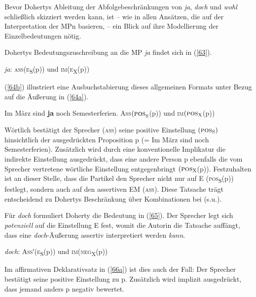 Bevor Dohertys Ableitung der Abfolgebeschränkungen von \textit{ja}, \textit{doch} und \textit{wohl} schließlich skizziert werden kann, ist – wie in allen Ansätzen, die auf der Interpretation der MPn basieren, – ein Blick auf ihre Modellierung der Einzelbedeutungen nötig.

Dohertys Bedeutungszuschreibung an die MP \textit{ja} findet sich in (\ref{63}).

\begin{exe}
	\ex\label{63} 
		\textit{ja}: \textsc{ass}(\textsc{e}\textsubscript{S}(\textrm{p})) und \textsc{im}(\textsc{e}\textsubscript{X}(\textrm{p}))
		\hfill\hbox{\citet[80]{Doherty1985}}
\end{exe}
(\ref{64b}) illustriert eine Ausbuchstabierung dieses allgemeinen Formats unter Bezug auf die Äußerung in (\ref{64a}).

\begin{exe}
	\ex\label{64} 
		\begin{xlist}	
			\ex\label{64a} Im März sind \textbf{ja} noch Semesterferien.
			\ex\label{64b} \textsc{Ass}${(\textsc{pos}}_{\textrm{{S}}}$(\textrm{p})) und \textsc{im}$(\textrm{\textsc{pos}}_{\textrm{X}}$(\textrm{p}))
		\end{xlist}
\end{exe}
Wörtlich bestätigt der Sprecher \textsc{(ass)} seine positive Einstellung $(\textrm{\textsc{pos}}_{\textrm{S}})$ hinsichtlich der ausgedrückten Proposition p (= Im März sind noch Semesterferien). Zu\-sätzlich wird durch eine konventionelle Implikatur die indirekte Einstellung ausgedrückt, dass eine andere Person p ebenfalls die vom Sprecher vertretene wörtliche Einstellung entgegenbringt $(\textrm{\textsc{pos}}_{\textrm{X}}$(\textrm{p})). Festzuhalten ist an dieser Stelle, dass die Partikel den Sprecher nicht nur auf E (\textsc{pos}\textsubscript{S}(p)) festlegt, sondern auch auf den assertiven EM \textsc{(ass)}. Diese Tatsache trägt entscheidend zu Dohertys Beschränkung über Kombinationen bei (s.u.).

Für \textit{doch} formuliert Doherty die Bedeutung in (\ref{65}). Der Sprecher legt sich \emph{potenziell} auf die Einstellung E fest, womit die Autorin die Tatsache auffängt, dass eine \textit{doch}-Äußerung assertiv interpretiert werden \emph{kann}.

\begin{exe}
	\ex\label{65} 
	\textit{doch}: \textsc{Ass′}(\textsc{e}\textsubscript{S}(p)) und \textsc{im(neg}\textsubscript{X}(p))
	\hfill\hbox{\citet[71]{Doherty1985}}
\end{exe}
Im affirmativen Deklarativsatz in (\ref{66a}) ist dies auch der Fall: Der Sprecher bestätigt seine positive Einstellung zu p. Zusätzlich wird implizit ausgedrückt, dass jemand anders p negativ bewertet. 

